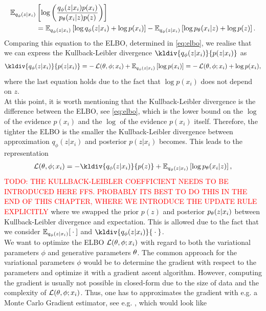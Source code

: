 \begin{align*}
\operatorname{\mathbb{E}}_{q_{\phi}(z|x_i)} &\left[ \log \left( \frac{q_{\phi}(z|x_i)p(x_i)}{p_{\theta}(x_i| z)p(z)} \right) \right]\\
&= \operatorname{\mathbb{E}}_{q_{\phi}(z|x_i)} \left[ \log q_{\phi}(z|x_i) + \log p(x_i)  \right] - \operatorname{\mathbb{E}}_{q_{\phi}(z|x_i)} \left[ \log p_{\theta}(x_i| z) + \log p(z)\right].
\end{align*}
Comparing this equation to the ELBO, determined in \eqref{eq:elbo}, we realise that we can express the Kullback-Leibler divergence $\kldiv{q_{\phi}(z|x_i)}{p(z|x_i)}$ as
\begin{align*}
\kldiv{q_{\phi}(z|x_i)}{p(z|x_i)} = - \loss(\t, \phi; x_i) + \E_{q_{\phi}(z|x_i)} \left[ \log p(x_i) \right] = - \loss(\t, \phi; x_i) + \log p(x_i),
\end{align*}
where the last equation holds due to the fact that $\log p(x_i)$ does not depend on $z$.\\
At this point, it is worth mentioning that the Kullback-Leibler divergence is the difference between the ELBO, see \eqref{eq:elbo}, which is the lower bound on the $\log$ of the evidence $p(x_i)$ and the $\log$ of the evidence $p(x_i)$ itself. Therefore, the tighter the ELBO is the smaller the Kullback-Leibler divergence between approximation $q_{\phi}(z|x_i)$ and posterior $p(z|x_i)$ becomes. This leads to the representation
\begin{align}\label{eq:alternative_loss}
\loss(\t,\phi ; x_i) = - \kldiv{q_{\phi}(z|x_i)}{p(z)} + \E_{q_{\phi}(z|x_i)} \left[ \log p_{\t}(x_i|z) \right],
\end{align}
\textcolor{red}{TODO: THE KULLBACK-LEIBLER COEFFICIENT NEEDS TO BE INTRODUCED HERE FFS. PROBABLY ITS BEST TO DO THIS IN THE END OF THIS CHAPTER, WHERE WE INTRODUCE THE UPDATE RULE EXPLICITLY}
where we swapped the prior $p(z)$ and posterior $p_{\theta}(z|x_i)$ between Kullback-Leibler divergence and expectation. This is allowed due to the fact that we consider $\operatorname{\mathbb{E}}_{q_{\phi}(z|x_i)}[{}\cdot{}]$ and $\kldiv{q_{\phi}(z|x_i)}{\wc}$.\\
We want to optimize the ELBO $\operatorname{\mathcal{L}}(\theta,\phi ; x_i)$ with regard to both the variational parameters $\phi$ and generative parameters $\theta$. The common approach for the variational parameters $\phi$ would be to determine the gradient with respect to the parameters and optimize it with a gradient ascent algorithm. However, computing the gradient is usually not possible in closed-form due to the size of data and the complexity of $\operatorname{\mathcal{L}}(\theta,\phi ; x_i) $. Thus, one has to approximates the gradient with e.g. a Monte Carlo Gradient estimator, see e.g. \cite[Section~11.1.6]{bishop2006pattern}, which would look like
